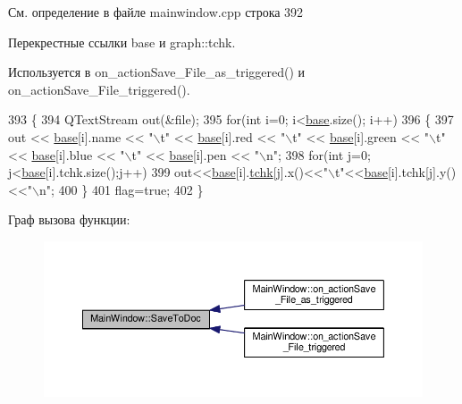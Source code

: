 См. определение в файле mainwindow.\+cpp строка 392



Перекрестные ссылки base и graph\+::tchk.



Используется в on\+\_\+action\+Save\+\_\+\+File\+\_\+as\+\_\+triggered() и on\+\_\+action\+Save\+\_\+\+File\+\_\+triggered().


\begin{DoxyCode}
393 \{
394     QTextStream out(&file);
395     \textcolor{keywordflow}{for}(\textcolor{keywordtype}{int} i=0; i<\hyperlink{class_main_window_a3413d4508f4981518b1b8ebf3b29121e}{base}.size(); i++)
396     \{
397         out << \hyperlink{class_main_window_a3413d4508f4981518b1b8ebf3b29121e}{base}[i].name << \textcolor{stringliteral}{"\(\backslash\)t"} << \hyperlink{class_main_window_a3413d4508f4981518b1b8ebf3b29121e}{base}[i].red << \textcolor{stringliteral}{"\(\backslash\)t"} << \hyperlink{class_main_window_a3413d4508f4981518b1b8ebf3b29121e}{base}[i].green << \textcolor{stringliteral}{"\(\backslash\)t"} << 
      \hyperlink{class_main_window_a3413d4508f4981518b1b8ebf3b29121e}{base}[i].blue << \textcolor{stringliteral}{"\(\backslash\)t"} << \hyperlink{class_main_window_a3413d4508f4981518b1b8ebf3b29121e}{base}[i].pen << \textcolor{stringliteral}{"\(\backslash\)n"};
398         \textcolor{keywordflow}{for}(\textcolor{keywordtype}{int} j=0; j<\hyperlink{class_main_window_a3413d4508f4981518b1b8ebf3b29121e}{base}[i].tchk.size();j++)
399             out<<\hyperlink{class_main_window_a3413d4508f4981518b1b8ebf3b29121e}{base}[i].\hyperlink{classgraph_afae7c6852c8de983693fb2fd108ed3c4}{tchk}[j].x()<<\textcolor{stringliteral}{"\(\backslash\)t"}<<\hyperlink{class_main_window_a3413d4508f4981518b1b8ebf3b29121e}{base}[i].tchk[j].y()<<\textcolor{stringliteral}{"\(\backslash\)n"};
400     \}
401     flag=\textcolor{keyword}{true};
402 \}
\end{DoxyCode}


Граф вызова функции\+:\nopagebreak
\begin{figure}[H]
\begin{center}
\leavevmode
\includegraphics[width=350pt]{class_main_window_aa84cdb1ab42ba6621bf43fc2d126bcf4_icgraph}
\end{center}
\end{figure}


